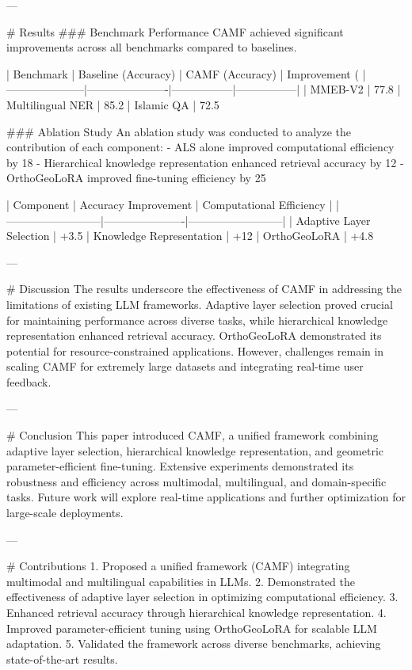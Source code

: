 ---

# Results
### Benchmark Performance
CAMF achieved significant improvements across all benchmarks compared to baselines.

| Benchmark          | Baseline (Accuracy) | CAMF (Accuracy) | Improvement (%
|---------------------|----------------------|-----------------|-----------------|
| MMEB-V2            | 77.8%
| Multilingual NER    | 85.2%
| Islamic QA          | 72.5%

### Ablation Study
An ablation study was conducted to analyze the contribution of each component:
- ALS alone improved computational efficiency by 18%
- Hierarchical knowledge representation enhanced retrieval accuracy by 12%
- OrthoGeoLoRA improved fine-tuning efficiency by 25%

| Component                | Accuracy Improvement | Computational Efficiency |
|--------------------------|----------------------|--------------------------|
| Adaptive Layer Selection | +3.5%
| Knowledge Representation | +12%
| OrthoGeoLoRA             | +4.8%

---

# Discussion
The results underscore the effectiveness of CAMF in addressing the limitations of existing LLM frameworks. Adaptive layer selection proved crucial for maintaining performance across diverse tasks, while hierarchical knowledge representation enhanced retrieval accuracy. OrthoGeoLoRA demonstrated its potential for resource-constrained applications. However, challenges remain in scaling CAMF for extremely large datasets and integrating real-time user feedback.

---

# Conclusion
This paper introduced CAMF, a unified framework combining adaptive layer selection, hierarchical knowledge representation, and geometric parameter-efficient fine-tuning. Extensive experiments demonstrated its robustness and efficiency across multimodal, multilingual, and domain-specific tasks. Future work will explore real-time applications and further optimization for large-scale deployments.

---

# Contributions
1. Proposed a unified framework (CAMF) integrating multimodal and multilingual capabilities in LLMs.
2. Demonstrated the effectiveness of adaptive layer selection in optimizing computational efficiency.
3. Enhanced retrieval accuracy through hierarchical knowledge representation.
4. Improved parameter-efficient tuning using OrthoGeoLoRA for scalable LLM adaptation.
5. Validated the framework across diverse benchmarks, achieving state-of-the-art results.